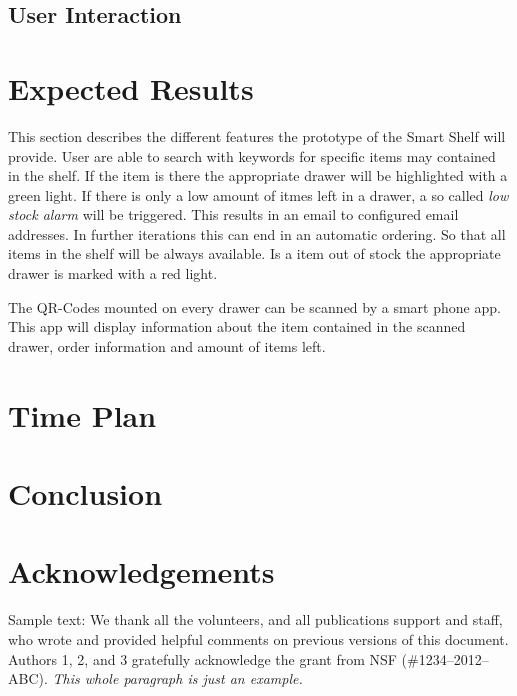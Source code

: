 \documentclass{sigchi}
\begin{document}
\subsection{User Interaction}


\section{Expected Results}
This section describes the different features the prototype of the Smart Shelf will provide. 
User are able to search with keywords for specific items may contained in the shelf. 
If the item is there the appropriate drawer will be highlighted with a green light. 
If there is only a low amount of itmes left in a drawer, a so called \textit{low stock alarm} will be triggered. 
This results in an email to configured email addresses. 
In further iterations this can end in an automatic ordering. 
So that all items in the shelf will be always available. 
Is a item out of stock the appropriate drawer is marked with a red light. 

The QR-Codes mounted on every drawer can be scanned by a smart phone app. 
This app will display information about the item contained in the scanned drawer, order information and amount of items left. 


\section{Time Plan}



\section{Conclusion}


\section{Acknowledgements}

Sample text: We thank all the volunteers, and all publications support
and staff, who wrote and provided helpful comments on previous
versions of this document. Authors 1, 2, and 3 gratefully acknowledge
the grant from NSF (\#1234--2012--ABC). \textit{This whole paragraph is
  just an example.}

%
%
%
%
%
\balance{}

\balance{}



\end{document}
